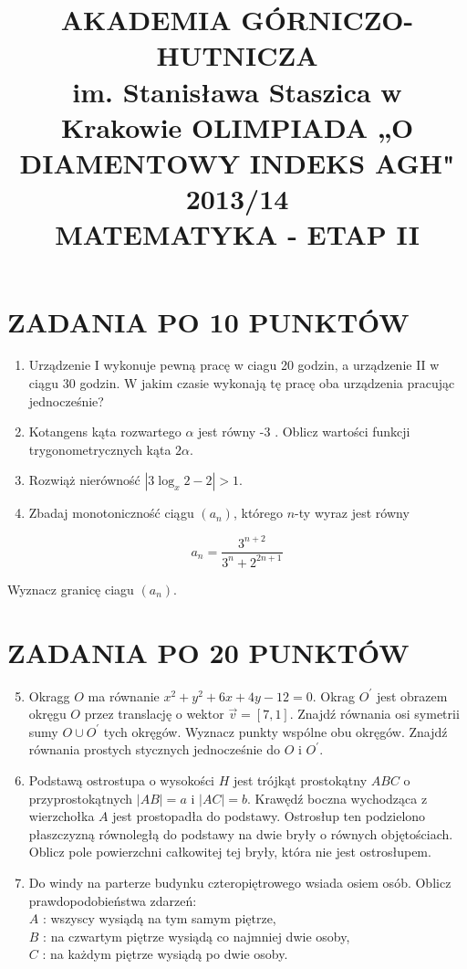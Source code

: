 \documentclass[10pt]{article}
\title{AKADEMIA GÓRNICZO-HUTNICZA \\
 im. Stanisława Staszica w Krakowie OLIMPIADA „O DIAMENTOWY INDEKS AGH" 2013/14 \\
 MATEMATYKA - ETAP II }
\author{}
\date{}
\begin{document}
\maketitle
\section*{ZADANIA PO 10 PUNKTÓW}
\begin{enumerate}
  \item Urządzenie I wykonuje pewną pracę w ciagu 20 godzin, a urządzenie II w ciągu 30 godzin. W jakim czasie wykonają tę pracę oba urządzenia pracując jednocześnie?
  \item Kotangens kąta rozwartego $\alpha$ jest równy -3 . Oblicz wartości funkcji trygonometrycznych kąta $2 \alpha$.
  \item Rozwiąż nierówność $\left|3 \log _{x} 2-2\right|>1$.
  \item Zbadaj monotoniczność ciągu $\left(a_{n}\right)$, którego $n$-ty wyraz jest równy
\end{enumerate}

$$
a_{n}=\frac{3^{n+2}}{3^{n}+2^{2 n+1}}
$$

Wyznacz granicę ciagu $\left(a_{n}\right)$.

\section*{ZADANIA PO 20 PUNKTÓW}
\begin{enumerate}
  \setcounter{enumi}{4}
  \item Okragg $O$ ma równanie $x^{2}+y^{2}+6 x+4 y-12=0$. Okrag $O^{\prime}$ jest obrazem okręgu $O$ przez translację o wektor $\vec{v}=[7,1]$. Znajdź równania osi symetrii sumy $O \cup O^{\prime}$ tych okręgów. Wyznacz punkty wspólne obu okręgów. Znajdź równania prostych stycznych jednocześnie do $O$ i $O^{\prime}$.
  \item Podstawą ostrostupa o wysokości $H$ jest trójkąt prostokątny $A B C$ o przyprostokątnych $|A B|=a$ i $|A C|=b$. Krawędź boczna wychodząca z wierzchołka $A$ jest prostopadła do podstawy. Ostrosłup ten podzielono płaszczyzną równoległą do podstawy na dwie bryły o równych objętościach. Oblicz pole powierzchni całkowitej tej bryły, która nie jest ostrosłupem.
  \item Do windy na parterze budynku czteropiętrowego wsiada osiem osób. Oblicz prawdopodobieństwa zdarzeń:\\
$A$ : wszyscy wysiądą na tym samym piętrze,\\
$B$ : na czwartym piętrze wysiądą co najmniej dwie osoby,\\
$C$ : na każdym piętrze wysiądą po dwie osoby.
\end{enumerate}
\end{document}
